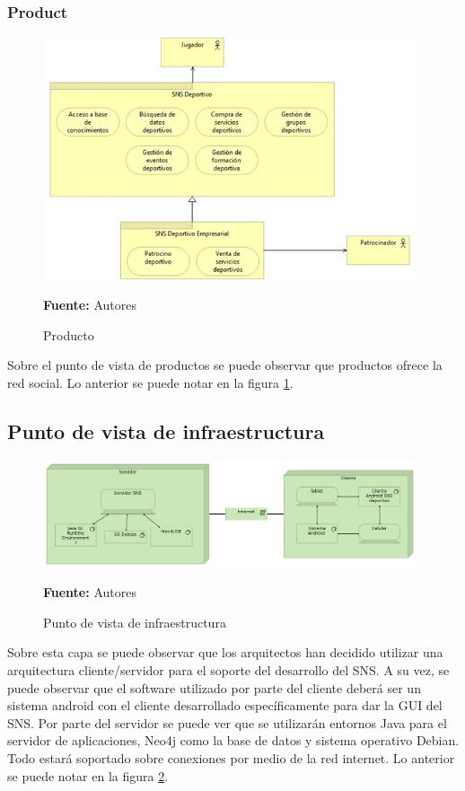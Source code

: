 \subsubsection{Product}

\begin{figure}[!htb]
  \begin{center}
    \includegraphics[width=11cm]{./imagenes/Archimate/vistas/generales/Product.png}
    \caption{Producto}
    \label{fig:Product}
    \textbf{Fuente:}  Autores \\
  \end{center}
\end{figure}

Sobre el punto de vista de productos se puede observar que productos ofrece la red social. Lo anterior se puede notar en la figura \ref{fig:Product}.

\subsection{Punto de vista de infraestructura}

\begin{figure}[!htb]
  \begin{center}
    \includegraphics[width=11cm]{./imagenes/Archimate/vistas/generales/infrastructure.png}
    \caption{Punto de vista de infraestructura}
    \label{fig:infrastructure}
    \textbf{Fuente:}  Autores \\
  \end{center}
\end{figure}

Sobre esta capa se puede observar que los arquitectos han decidido utilizar una arquitectura cliente/servidor para el soporte del desarrollo del SNS. A su vez, se puede observar que el software utilizado por parte del cliente deberá ser un sistema android con el cliente desarrollado específicamente para dar la GUI del SNS. Por parte del servidor se puede ver que se utilizarán entornos Java para el servidor de aplicaciones, Neo4j como la base de datos y sistema operativo Debian. Todo estará soportado sobre conexiones por medio de la red internet. Lo anterior se puede notar en la figura \ref{fig:infrastructure}.